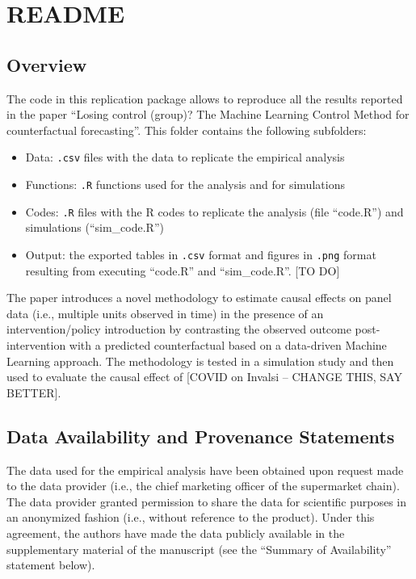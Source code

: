 \documentclass[
]{article}
\author{}
\date{}
\begin{document}
\hypertarget{template-readme-and-guidance}{%
\section{README}}


\hypertarget{overview}{%
\subsection{Overview}\label{overview}}

The code in this replication package allows to reproduce all the results reported in the paper ``Losing control (group)? The Machine Learning Control Method for counterfactual forecasting''. This folder contains the following subfolders: 

\begin{itemize}
\item Data: \texttt{.csv} files with the data to replicate the empirical analysis
\item Functions: \texttt{.R} functions used for the analysis and for simulations
\item Codes: \texttt{.R} files with the R codes to replicate the analysis (file ``code.R'') and simulations (``sim\_code.R'')
\item Output: the exported tables in \texttt{.csv} format and figures in \texttt{.png} format resulting from executing ``code.R'' and ``sim\_code.R''. [TO DO]
\end{itemize}

The paper introduces a novel methodology to estimate causal effects on panel data (i.e., multiple units observed in time) in the presence of an intervention/policy introduction by contrasting the observed outcome post-intervention with a predicted counterfactual based on a data-driven Machine Learning approach. The methodology is tested in a simulation study and then used to evaluate the causal effect of [COVID on Invalsi -- CHANGE THIS, SAY BETTER].


\hypertarget{data-availability-and-provenance-statements}{%
\subsection{Data Availability and Provenance Statements}\label{data-availability-and-provenance-statements}}

The data used for the empirical analysis have been obtained upon request made to the data provider (i.e., the chief marketing officer of the supermarket chain). The data provider granted permission to share the data for scientific purposes in an anonymized fashion (i.e., without reference to the product). Under this agreement, the authors have made the data publicly available in the supplementary material of the manuscript (see the ``Summary of Availability'' statement below).
\end{document}
